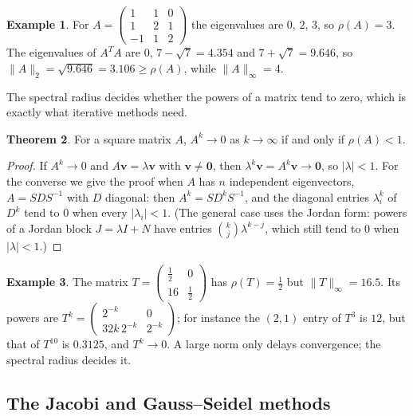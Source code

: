\documentclass[11pt,a4paper]{article}
\numberwithin{equation}{section}
\theoremstyle{definition}
\newtheorem{thm}{Theorem}[subsection]
\newtheorem{exa}[thm]{Example}
\begin{document}
\begin{exa}
For $A = \begin{pmatrix}1&1&0\\1&2&1\\-1&1&2\end{pmatrix}$ the eigenvalues are $0$, $2$, $3$, so $\rho(A) = 3$. The eigenvalues of $A^TA$ are
$0$, $7-\sqrt7 = 4.354$ and $7+\sqrt7 = 9.646$, so $\|A\|_2 = \sqrt{9.646} = 3.106\geq\rho(A)$, while $\|A\|_\infty = 4$.
\end{exa}

The spectral radius decides whether the powers of a matrix tend to zero, which is exactly what iterative methods need.

\begin{thm}
\label{thm:convergentmatrix}
For a square matrix $A$, $A^k\longrightarrow0$ as $k\longrightarrow\infty$ if and only if $\rho(A)<1$.
\end{thm}

\begin{proof}
If $A^k\longrightarrow0$ and $A\mathbf v = \lambda\mathbf v$ with $\mathbf v\neq\mathbf 0$, then $\lambda^k\mathbf v = A^k\mathbf v\longrightarrow\mathbf 0$, so
$|\lambda|<1$. For the converse we give the proof when $A$ has $n$ independent eigenvectors, $A = SDS^{-1}$ with $D$ diagonal: then
$A^k = SD^kS^{-1}$, and the diagonal entries $\lambda_i^k$ of $D^k$ tend to $0$ when every $|\lambda_i|<1$. (The general case uses the
Jordan form: powers of a Jordan block $J = \lambda I+N$ have entries $\binom{k}{j}\lambda^{k-j}$, which still tend to $0$ when $|\lambda|<1$.)
\end{proof}

\begin{exa}
The matrix $T = \begin{pmatrix}\frac12&0\\16&\frac12\end{pmatrix}$ has $\rho(T) = \frac12$ but $\|T\|_\infty = 16.5$. Its powers are
$T^k = \begin{pmatrix}2^{-k}&0\\ 32k\,2^{-k}&2^{-k}\end{pmatrix}$; for instance the $(2,1)$ entry of $T^3$ is $12$, but that of $T^{10}$ is $0.3125$,
and $T^k\longrightarrow0$. A large norm only delays convergence; the spectral radius decides it.
\end{exa}


\subsection{The Jacobi and Gauss--Seidel methods}
\label{sec:jacobigs}
\end{document}

